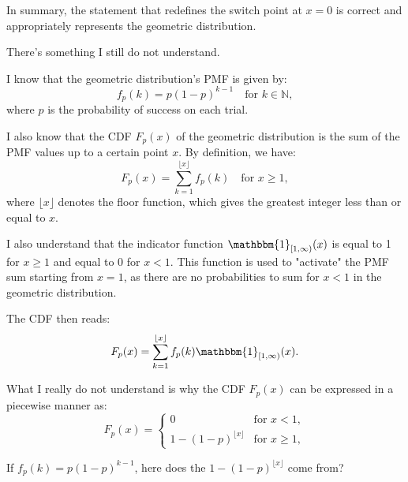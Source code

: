 \documentclass[12pt]{article}
\begin{document}
In summary, the statement that redefines the switch point at \( x = 0 \) is correct and appropriately represents the geometric distribution.


\newpage

There's something I still do not understand. 

I know that the geometric distribution's PMF is given by:
\[
f_{p}(k) = p(1-p)^{k-1} \quad \text{for } k \in \mathbb{N},
\]
where \( p \) is the probability of success on each trial.

I also know that the CDF \( F_{p}(x) \) of the geometric distribution is the sum of the PMF values up to a certain point \( x \). By definition, we have:
\[
F_p(x) = \sum_{k=1}^{\lfloor x \rfloor} f_p(k) \quad \text{for } x \geq 1,
\]
where \( \lfloor x \rfloor \) denotes the floor function, which gives the greatest integer less than or equal to \( x \).

I also understand that the indicator function \( \mathbbm{1}_{[1, \infty)}(x) \) is equal to 1 for \( x \geq 1 \) and equal to 0 for \( x < 1 \). This function is used to "activate" the PMF sum starting from \( x = 1 \), as there are no probabilities to sum for \( x < 1 \) in the geometric distribution.

The CDF then reads:
\[
F_p(x)=\sum_{k=1}^{\lfloor x \rfloor} f_p(k) \mathbbm{1}_{[1, \infty)}(x).
\]


What I really do not understand is why the CDF \( F_{p}(x) \) can be expressed in a piecewise manner as:
\[
F_p(x) = 
\begin{cases}
0 & \text{for } x < 1, \\
1 - (1 - p)^{\lfloor x \rfloor} & \text{for } x \geq 1,
\end{cases}
\]



If $f_{p}(k) = p(1-p)^{k-1}$,  here does the $1 - (1 - p)^{\lfloor x \rfloor}$ come from?
\end{document}
